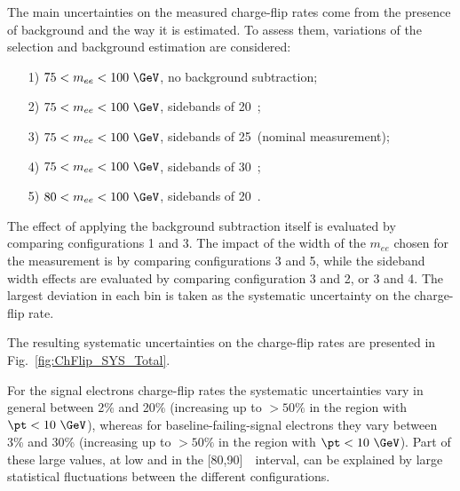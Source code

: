 The main uncertainties on the measured charge-flip rates come from the presence of background and the way it is estimated. To assess them, variations of the selection and background estimation are considered: 
\begin{itemize}
\item[1)] $75<m_{ee}<100~\GeV$, no background subtraction;
\item[2)] $75<m_{ee}<100~\GeV$, sidebands of 20~\GeV;
\item[3)] $75<m_{ee}<100~\GeV$, sidebands of 25~\GeV (nominal measurement);
\item[4)] $75<m_{ee}<100~\GeV$, sidebands of 30~\GeV;
\item[5)] $80<m_{ee}<100~\GeV$, sidebands of 20~\GeV.
\end{itemize}

The effect of applying the background subtraction itself is evaluated by comparing configurations 1 and 3. 
The impact of the width of the $m_{ee}$ chosen for the measurement is  by comparing configurations 3 and 5, 
while the sideband width effects are evaluated by comparing configuration 3 and 2, or 3 and 4. 
The largest deviation in each bin is taken as the systematic uncertainty on the charge-flip rate.

The resulting systematic uncertainties on the charge-flip rates are presented in Fig.~\ref{fig:ChFlip_SYS_Total}. 

For the signal electrons charge-flip rates the systematic uncertainties vary in general between 2\% and 20\% (increasing up to $>50\%$ in the region with $\pt < 10~\GeV$), whereas for baseline-failing-signal electrons they vary between 3\% and 30\% (increasing up to $>50\%$ in the region with $\pt < 10~\GeV$). Part of these large values, at low \pt and in the [80,90]~\GeV~\pt interval, can be explained by large statistical fluctuations between the different configurations.
